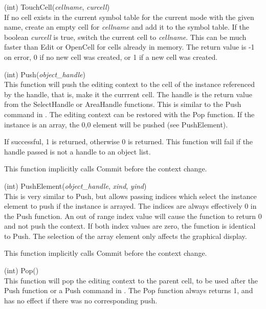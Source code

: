 \begin{description}
\item{(int) \vt TouchCell({\it cellname\/}, {\it curcell\/})}\\
If no cell exists in the current symbol table for the current mode
with the given name, create an empty cell for {\it cellname} and add
it to the symbol table.  If the boolean {\it curcell} is true, switch
the current cell to {\it cellname}.  This can be much faster than {\vt
Edit} or {\vt OpenCell} for cells already in memory.  The return value
is -1 on error, 0 if no new cell was created, or 1 if a new cell was
created.

\item{(int) \vt Push({\it object\_handle\/})}\\
This function will push the editing context to the cell of the
instance referenced by the handle, that is, make it the currrent cell. 
The handle is the return value from the {\vt SelectHandle} or {\vt
AreaHandle} functions.  This is similar to the {\cb Push} command in
{\Xic}.  The editing context can be restored with the {\vt Pop}
function.  If the instance is an array, the 0,0 element will be pushed
(see {\vt PushElement}).

If successful, 1 is returned, otherwise 0 is returned.  This function
will fail if the handle passed is not a handle to an object list.

This function implicitly calls {\vt Commit} before the context change.

\item{(int) \vt PushElement({\it object\_handle\/}, {\it xind\/},
  {\it yind\/})}\\
This is very similar to {\vt Push}, but allows passing indices which
select the instance element to push if the instance is arrayed.  The
indices are always effectively 0 in the {\vt Push} function.  An out
of range index value will cause the function to return 0 and not push
the context.  If both index values are zero, the function is identical
to {\vt Push}.  The selection of the array element only affects the
graphical display.

This function implicitly calls {\vt Commit} before the context change.

\item{(int) \vt Pop()}\\
This function will pop the editing context to the parent cell, to be
used after the {\vt Push} function or a {\cb Push} command in {\Xic}. 
The {\vt Pop} function always returns 1, and has no effect if there
was no corresponding push.


\end{description}
